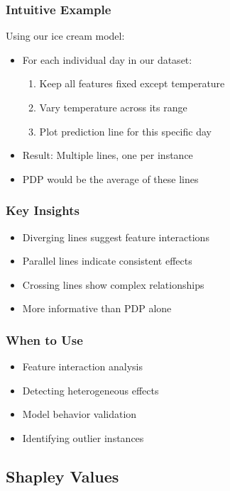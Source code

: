 \documentclass{article}
\begin{document}
\subsubsection{Intuitive Example}
Using our ice cream model:
\begin{itemize}
    \item For each individual day in our dataset:
    \begin{enumerate}
        \item Keep all features fixed except temperature
        \item Vary temperature across its range
        \item Plot prediction line for this specific day
    \end{enumerate}
    \item Result: Multiple lines, one per instance
    \item PDP would be the average of these lines
\end{itemize}

\subsubsection{Key Insights}
\begin{itemize}
    \item Diverging lines suggest feature interactions
    \item Parallel lines indicate consistent effects
    \item Crossing lines show complex relationships
    \item More informative than PDP alone
\end{itemize}

\subsubsection{When to Use}
\begin{itemize}
    \item Feature interaction analysis
    \item Detecting heterogeneous effects
    \item Model behavior validation
    \item Identifying outlier instances
\end{itemize}

\subsection{Shapley Values}
\end{document}
